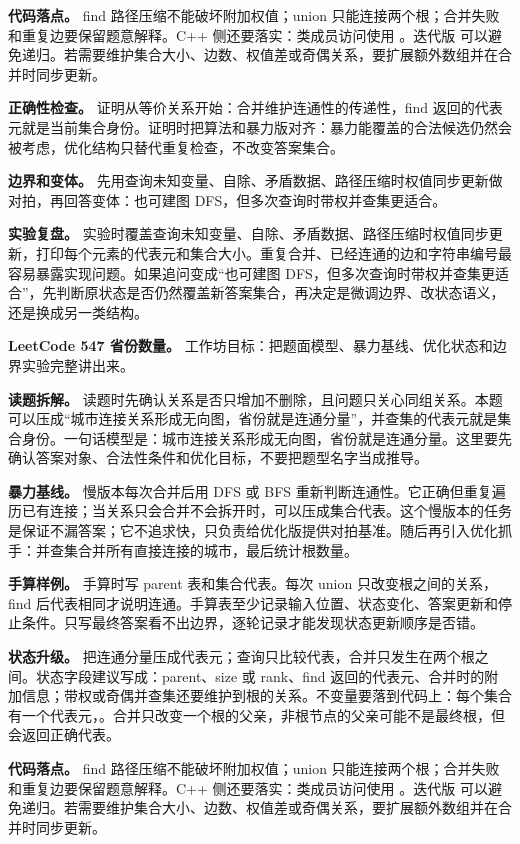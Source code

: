 \textbf{代码落点。} find 路径压缩不能破坏附加权值；union 只能连接两个根；合并失败和重复边要保留题意解释。C++ 侧还要落实：类成员访问使用 。迭代版  可以避免递归。若需要维护集合大小、边数、权值差或奇偶关系，要扩展额外数组并在合并时同步更新。

\textbf{正确性检查。} 证明从等价关系开始：合并维护连通性的传递性，find 返回的代表元就是当前集合身份。证明时把算法和暴力版对齐：暴力能覆盖的合法候选仍然会被考虑，优化结构只替代重复检查，不改变答案集合。

\textbf{边界和变体。} 先用查询未知变量、自除、矛盾数据、路径压缩时权值同步更新做对拍，再回答变体：也可建图 DFS，但多次查询时带权并查集更适合。

\textbf{实验复盘。} 实验时覆盖查询未知变量、自除、矛盾数据、路径压缩时权值同步更新，打印每个元素的代表元和集合大小。重复合并、已经连通的边和字符串编号最容易暴露实现问题。如果追问变成“也可建图 DFS，但多次查询时带权并查集更适合”，先判断原状态是否仍然覆盖新答案集合，再决定是微调边界、改状态语义，还是换成另一类结构。

\noindent\textbf{LeetCode 547 省份数量。} 工作坊目标：把题面模型、暴力基线、优化状态和边界实验完整讲出来。

\textbf{读题拆解。} 读题时先确认关系是否只增加不删除，且问题只关心同组关系。本题可以压成“城市连接关系形成无向图，省份就是连通分量”，并查集的代表元就是集合身份。一句话模型是：城市连接关系形成无向图，省份就是连通分量。这里要先确认答案对象、合法性条件和优化目标，不要把题型名字当成推导。

\textbf{暴力基线。} 慢版本每次合并后用 DFS 或 BFS 重新判断连通性。它正确但重复遍历已有连接；当关系只会合并不会拆开时，可以压成集合代表。这个慢版本的任务是保证不漏答案；它不追求快，只负责给优化版提供对拍基准。随后再引入优化抓手：并查集合并所有直接连接的城市，最后统计根数量。

\textbf{手算样例。} 手算时写 parent 表和集合代表。每次 union 只改变根之间的关系，find 后代表相同才说明连通。手算表至少记录输入位置、状态变化、答案更新和停止条件。只写最终答案看不出边界，逐轮记录才能发现状态更新顺序是否错。

\textbf{状态升级。} 把连通分量压成代表元；查询只比较代表，合并只发生在两个根之间。状态字段建议写成：parent、size 或 rank、find 返回的代表元、合并时的附加信息；带权或奇偶并查集还要维护到根的关系。不变量要落到代码上：每个集合有一个代表元，。合并只改变一个根的父亲，非根节点的父亲可能不是最终根，但  会返回正确代表。

\textbf{代码落点。} find 路径压缩不能破坏附加权值；union 只能连接两个根；合并失败和重复边要保留题意解释。C++ 侧还要落实：类成员访问使用 。迭代版  可以避免递归。若需要维护集合大小、边数、权值差或奇偶关系，要扩展额外数组并在合并时同步更新。

